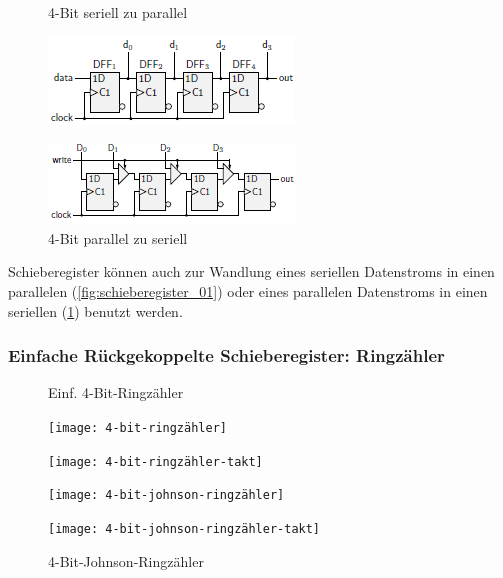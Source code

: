 \documentclass[12pt]{report}
\begin{document}
\begin{figure}[H]
  \begin{minipage}[t]{0.45\textwidth}
    \caption{4-Bit seriell zu parallel}
    \label{fig:schieberegister_01}
    \centering
    \includegraphics{schieberegister_01}
  \end{minipage}
  \hfill
  \begin{minipage}[t]{0.45\textwidth}
    \caption{4-Bit parallel zu seriell}
    \label{fig:schieberegister_02}
    \centering
    \includegraphics{schieberegister_02}
  \end{minipage}
\end{figure}

Schieberegister können auch zur Wandlung eines seriellen Datenstroms in einen parallelen (\ref{fig:schieberegister_01})
oder eines parallelen Datenstroms in einen seriellen (\ref{fig:schieberegister_02}) benutzt werden.

\subsubsection{Einfache Rückgekoppelte Schieberegister: Ringzähler}
\begin{figure}[H]
  \begin{minipage}[t]{0.45\textwidth}
    \caption{Einf. 4-Bit-Ringzähler}
    
    \centering
    \texttt{[image: 4-bit-ringzähler]}
    
    \texttt{[image: 4-bit-ringzähler-takt]}
  \end{minipage}
  \hfill
  \begin{minipage}[t]{0.45\textwidth}
    \caption{4-Bit-Johnson-Ringzähler}
    
    \centering
    \texttt{[image: 4-bit-johnson-ringzähler]}
    
    \texttt{[image: 4-bit-johnson-ringzähler-takt]}
  \end{minipage}
\end{figure}
\end{document}
